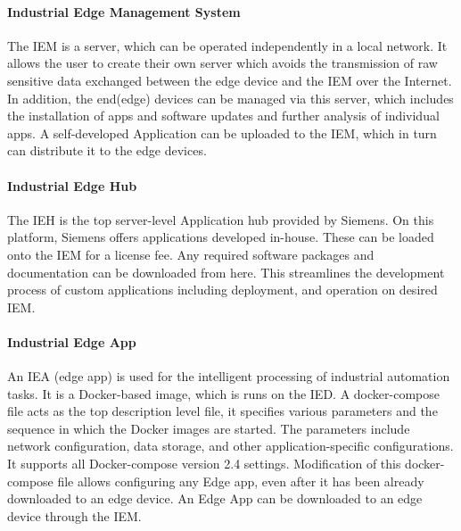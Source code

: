 			
		\paragraph{Industrial Edge Management System}
			The \gls{IEM} is a server, which can be operated independently in a local network. It allows the user to create their own server which avoids the transmission of raw sensitive data exchanged between the edge device and the IEM over the Internet.
			In addition, the end(edge) devices can be managed via this server, which includes the installation of apps and software updates and further analysis of individual apps. A self-developed Application can be uploaded to the IEM, which in turn can distribute it to the edge devices.\cite{siemensIndustrialEdge}

		\paragraph{Industrial Edge Hub}
			The \gls{IEH} 
			is the top server-level Application hub provided by Siemens. On this platform, Siemens offers applications developed in-house. These can be loaded onto the IEM for a license fee. Any required software packages and documentation can be downloaded from here. This streamlines the development process of custom applications including deployment, and operation on desired IEM.\cite{siemensIndustrialEdge}

		\paragraph{Industrial Edge App}
			An \gls{IEA} (edge app) is used for the intelligent processing of industrial automation tasks.\cite{siemensIndustrialEdge} It is a Docker-based image, which is runs on the IED. A docker-compose file acts as the top description level file, it specifies various parameters and the sequence in which the Docker images are started. The parameters include network configuration, data storage, and other application-specific configurations. It supports all Docker-compose version 2.4 settings. Modification of this docker-compose file allows configuring any Edge app, even after it has been already downloaded to an edge device. An Edge App can be downloaded to an edge device through the IEM.
	
